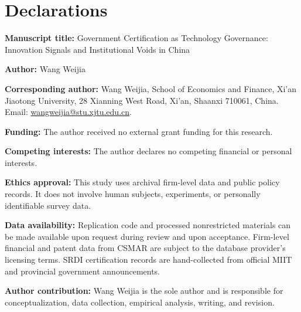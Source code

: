 \documentclass[12pt]{article}
\begin{document}
\section*{Declarations}

\noindent\textbf{Manuscript title:} Government Certification as Technology Governance: Innovation Signals and Institutional Voids in China

\vspace{0.8em}

\noindent\textbf{Author:} Wang Weijia

\vspace{0.8em}

\noindent\textbf{Corresponding author:} Wang Weijia, School of Economics and Finance, Xi'an Jiaotong University, 28 Xianning West Road, Xi'an, Shaanxi 710061, China. Email: \href{mailto:wangweijia@stu.xjtu.edu.cn}{wangweijia@stu.xjtu.edu.cn}.

\vspace{0.8em}

\noindent\textbf{Funding:} The author received no external grant funding for this research.

\vspace{0.8em}

\noindent\textbf{Competing interests:} The author declares no competing financial or personal interests.

\vspace{0.8em}

\noindent\textbf{Ethics approval:} This study uses archival firm-level data and public policy records. It does not involve human subjects, experiments, or personally identifiable survey data.

\vspace{0.8em}

\noindent\textbf{Data availability:} Replication code and processed nonrestricted materials can be made available upon request during review and upon acceptance. Firm-level financial and patent data from CSMAR are subject to the database provider's licensing terms. SRDI certification records are hand-collected from official MIIT and provincial government announcements.

\vspace{0.8em}

\noindent\textbf{Author contribution:} Wang Weijia is the sole author and is responsible for conceptualization, data collection, empirical analysis, writing, and revision.

\vspace{0.8em}
\end{document}
